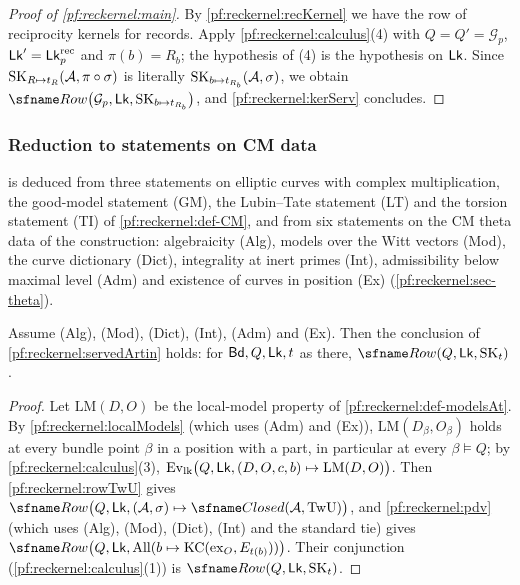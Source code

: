 \begin{proof}[Proof of \cref{pf:reckernel:main}]
By \cref{pf:reckernel:recKernel} we have the row of reciprocity kernels for records. Apply
\cref{pf:reckernel:calculus}(4) with $Q=Q'=\mathcal G_p$, $\mathsf{Lk}'=\mathsf{Lk}^{\mathrm{rec}}_p$ and $\pi(b)=R_b$; the
hypothesis of (4) is the hypothesis on $\mathsf{Lk}$. Since $\mathrm{SK}_{R\mapsto t_R}(\mathcal A,\pi\circ\sigma)$ is
literally $\mathrm{SK}_{b\mapsto t_{R_b}}(\mathcal A,\sigma)$, we obtain
$\reckRow\bigl(\mathcal G_p,\reckLk,\reckServH_{b\mapsto t_{R_b}}\bigr)$, and \cref{pf:reckernel:kerServ} concludes.
\end{proof}

\subsubsection{Reduction to statements on CM data}
 is deduced from three statements on elliptic curves with complex multiplication, the
good-model statement (GM), the Lubin--Tate statement (LT) and the torsion statement (TI) of
\cref{pf:reckernel:def-CM}, and from six statements on the CM theta data of the construction: algebraicity (Alg),
models over the Witt vectors (Mod), the curve dictionary (Dict), integrality at inert primes (Int), admissibility
below maximal level (Adm) and existence of curves in position (Ex) (\cref{pf:reckernel:sec-theta}).

\begin{theorem}\label{pf:reckernel:six}
Assume \textup{(Alg)}, \textup{(Mod)}, \textup{(Dict)}, \textup{(Int)}, \textup{(Adm)} and \textup{(Ex)}. Then the
conclusion of \cref{pf:reckernel:servedArtin} holds: for $\mathsf{Bd},Q,\mathsf{Lk},t$ as there,
$\reckRow(Q,\reckLk,\reckServH_t)$.
\end{theorem}

\begin{proof}
Let $\mathrm{LM}(D,O)$ be the local-model property of \cref{pf:reckernel:def-modelsAt}. By
\cref{pf:reckernel:localModels} (which uses (Adm) and (Ex)), $\mathrm{LM}(D_\beta,O_\beta)$ holds at every bundle point
$\beta$ in a position with a part, in particular at every $\beta\models Q$; by \cref{pf:reckernel:calculus}(3),
$\mathrm{Ev}_{\mathrm{lk}}\bigl(Q,\mathsf{Lk},(D,O,c,b)\mapsto\mathrm{LM}(D,O)\bigr)$. Then \cref{pf:reckernel:rowTwU} gives
$\reckRow\bigl(Q,\reckLk,(\mathcal A,\sigma)\mapsto\reckClosed(\mathcal A,\mathrm{TwU})\bigr)$, and
\cref{pf:reckernel:pdv} (which uses (Alg), (Mod), (Dict), (Int) and the standard tie) gives
$\reckRow\bigl(Q,\reckLk,\reckAtAll(b\mapsto\mathrm{KC}(\mathrm{ex}_O,E_{t(b)}))\bigr)$. Their conjunction
(\cref{pf:reckernel:calculus}(1)) is $\reckRow(Q,\reckLk,\reckServH_t)$.
\end{proof}

